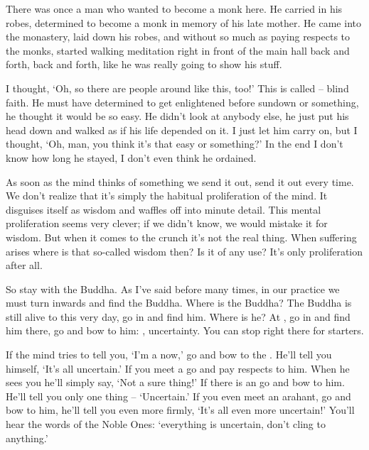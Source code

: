 There was once a man who wanted to become a monk here. He carried in his robes, determined to become a monk in memory of his late mother. He came into the monastery, laid down his robes, and without so much as paying respects to the monks, started walking meditation right in front of the main hall back and forth, back and forth, like he was really going to show his stuff. 

I thought, `Oh, so there are people around like this, too!' This is called   -- blind faith. He must have determined to get enlightened before sundown or something, he thought it would be so easy. He didn't look at anybody else, he just put his head down and walked as if his life depended on it. I just let him carry on, but I thought, `Oh, man, you think it's that easy or something?' In the end I don't know how long he stayed, I don't even think he ordained. 

As soon as the mind thinks of something we send it out, send it out every time. We don't realize that it's simply the habitual proliferation of the mind. It disguises itself as wisdom and waffles off into minute detail. This mental proliferation seems very clever; if we didn't know, we would mistake it for wisdom. But when it comes to the crunch it's not the real thing. When suffering arises where is that so-called wisdom then? Is it of any use? It's only proliferation after all. 

So stay with the Buddha. As I've said before many times, in our practice we must turn inwards and find the Buddha. Where is the Buddha? The Buddha is still alive to this very day, go in and find him. Where is he? At , go in and find him there, go and bow to him: , uncertainty. You can stop right there for starters. 

If the mind tries to tell you, `I'm a  now,' go and bow to the . He'll tell you himself, `It's all uncertain.' If you meet a  go and pay respects to him. When he sees you he'll simply say, `Not a sure thing!' If there is an  go and bow to him. He'll tell you only one thing -- `Uncertain.' If you even meet an arahant, go and bow to him, he'll tell you even more firmly, `It's all even more uncertain!' You'll hear the words of the Noble Ones: `everything is uncertain, don't cling to \mbox{anything.'} 

